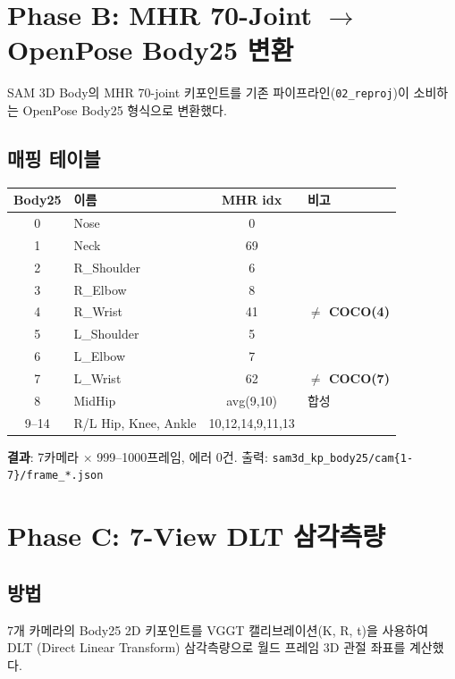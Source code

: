 \documentclass[11pt, a4paper]{article}
\begin{document}
\section{Phase B: MHR 70-Joint $\to$ OpenPose Body25 변환}

SAM 3D Body의 MHR 70-joint 키포인트를 기존 파이프라인(\texttt{02\_reproj})이 소비하는 OpenPose Body25 형식으로 변환했다.

\subsection{매핑 테이블}

\begin{center}
\begin{tabular}{c l c l}
\toprule
\textbf{Body25} & \textbf{이름} & \textbf{MHR idx} & \textbf{비고} \\
\midrule
0 & Nose & 0 & \\
1 & Neck & 69 & \\
2 & R\_Shoulder & 6 & \\
3 & R\_Elbow & 8 & \\
4 & R\_Wrist & 41 & \textbf{$\neq$ COCO(4)} \\
5 & L\_Shoulder & 5 & \\
6 & L\_Elbow & 7 & \\
7 & L\_Wrist & 62 & \textbf{$\neq$ COCO(7)} \\
8 & MidHip & avg(9,10) & 합성 \\
9--14 & R/L Hip, Knee, Ankle & 10,12,14,9,11,13 & \\
\bottomrule
\end{tabular}
\end{center}

\textbf{결과}: 7카메라 $\times$ 999--1000프레임, 에러 0건. 출력: \texttt{sam3d\_kp\_body25/cam\{1-7\}/frame\_*.json}

\section{Phase C: 7-View DLT 삼각측량}

\subsection{방법}

7개 카메라의 Body25 2D 키포인트를 VGGT 캘리브레이션(K, R, t)을 사용하여 DLT (Direct Linear Transform) 삼각측량으로 월드 프레임 3D 관절 좌표를 계산했다.
\end{document}
